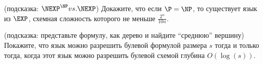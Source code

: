 \breakline

\begin{ptask}{26}(подсказка: $\NEXP^{\NP} vs. \NEXP$)
    Докажите, что если $\P = \NP$, то существует язык из $\EXP$, схемная сложность которого не меньше $\frac{2^n}{10 n}$.
\end{ptask}

\begin{ptask}{37} (подсказка: представьте формулу, как дерево и найдите ``среднюю'' вершину)
    Покажите, что язык можно разрешить булевой формулой размера $s$ тогда и только тогда, когда этот язык можно разрешить булевой
    схемой глубина $O(\log(s))$.
\end{ptask}


